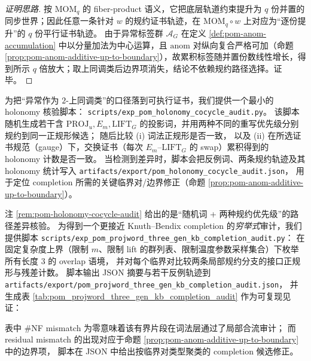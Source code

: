 \begin{proof}[证明思路]
按 \(\mathrm{MOM}_q\) 的 fiber-product 语义，它把底层轨道约束提升为 \(q\) 份并置的同步世界；因此任意一条针对 \(w\) 的规约证书轨迹，在 \(\mathrm{MOM}_q\circ w\) 上对应为“逐份提升”的 \(q\) 份平行证书轨迹。
由于异常标签群 \(\mathcal{A}_G\) 在定义 \ref{def:pom-anom-accumulation} 中以分量加法为中心运算，且 \(\mathrm{anom}\) 对纵向复合严格可加（命题 \ref{prop:pom-anom-additive-up-to-boundary}），故累积标签随并置份数线性增长，得到所示 \(q\) 倍放大；取上同调类后边界项消失，结论不依赖规约路径选择。证毕。
\end{proof}

\begin{remark}\label{rem:pom-holonomy-cocycle-audit}
为把“异常作为 \(2\)-上同调类”的口径落到可执行证书，我们提供一个最小的 holonomy 核验脚本：
\texttt{scripts/exp\_pom\_holonomy\_cocycle\_audit.py}。
该脚本随机生成若干含 \(\mathrm{PROJ}_u,E_m,\mathrm{LIFT}_G\) 的投影词，并用两种不同的重写优先级分别规约到同一正规形候选；
随后比较
(i) 词法正规形是否一致，
以及
(ii) 在所选证书规范（gauge）下，交换证书（每次 \(E_m\)--\(\mathrm{LIFT}_G\) 的 swap）累积得到的 holonomy 计数是否一致。
当检测到差异时，脚本会把反例词、两条规约轨迹及其 holonomy 统计写入
\texttt{artifacts/export/pom\_holonomy\_cocycle\_audit.json}，
用于定位 completion 所需的关键临界对/边界修正（命题 \ref{prop:pom-anom-additive-up-to-boundary}）。
\end{remark}

\begin{remark}\label{rem:pom-threegen-kb-completion-audit}
注 \ref{rem:pom-holonomy-cocycle-audit} 给出的是“随机词 + 两种规约优先级”的路径差异核验。
为得到一个更接近 Knuth--Bendix completion 的\emph{穷举式}审计，我们提供脚本
\texttt{scripts/exp\_pom\_projword\_three\_gen\_kb\_completion\_audit.py}：
在固定复杂度上界（限制 \(m\)、限制 lift 的群列表、限制温度参数采样集合）下枚举所有长度 \(3\) 的 overlap 语境，
并对每个临界对比较两条局部规约分支的接口正规形与残差计数。
脚本输出 JSON 摘要与若干反例轨迹到
\texttt{artifacts/export/pom\_projword\_three\_gen\_kb\_completion\_audit.json}，
并生成表 \ref{tab:pom_projword_three_gen_kb_completion_audit} 作为可复现见证：

\noindent 表中 \(\#\)NF mismatch 为零意味着该有界片段在词法层通过了局部合流审计；
而 residual mismatch 的出现对应于命题 \ref{prop:pom-anom-additive-up-to-boundary} 中的边界项，
脚本在 JSON 中给出按临界对类型聚类的 completion 候选修正。
\end{remark}

